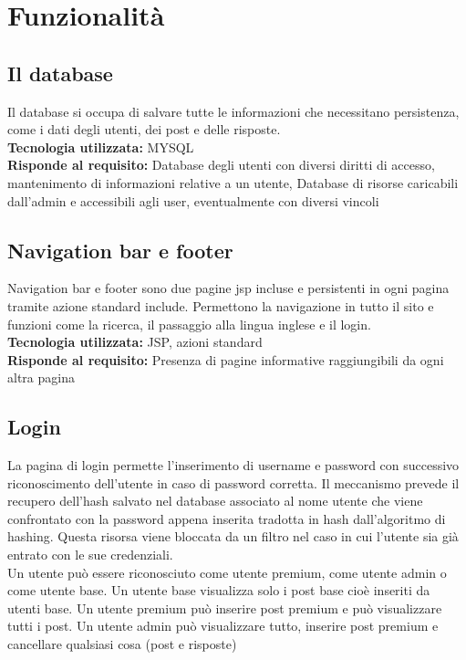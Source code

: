 \documentclass{article} %
\begin{document}
    \section{Funzionalità}

    \subsection{Il database}
    Il database si occupa di salvare tutte le informazioni che necessitano persistenza, come i dati degli utenti,
    dei post e delle risposte. \\

    \textbf{Tecnologia utilizzata:} MYSQL \\
    \textbf{Risponde al requisito:} Database degli utenti con diversi diritti di accesso, mantenimento di informazioni relative a un utente,
    Database di risorse caricabili dall’admin e accessibili agli user, eventualmente con diversi vincoli

    \subsection{Navigation bar e footer}
    Navigation bar e footer sono due pagine jsp incluse e persistenti in ogni pagina tramite azione standard include.
    Permettono la navigazione in tutto il sito e funzioni come la ricerca, il passaggio alla lingua inglese e il login. \\

    \textbf{Tecnologia utilizzata:} JSP, azioni standard \\
    \textbf{Risponde al requisito:} Presenza di pagine informative raggiungibili da ogni altra pagina

    \subsection{Login}
    La pagina di login permette l'inserimento di username e password con successivo riconoscimento
    dell'utente in caso di password corretta. Il meccanismo prevede il recupero dell'hash salvato nel database
    associato al nome utente che viene confrontato con la password appena inserita tradotta in hash dall'algoritmo
    di hashing. Questa risorsa viene bloccata da un filtro nel caso in cui l'utente sia già entrato con le sue credenziali. \\

    Un utente può essere riconosciuto come utente premium, come utente admin o come utente base.
    Un utente base visualizza solo i post base cioè inseriti da utenti base.
    Un utente premium può inserire post premium e può visualizzare tutti i post.
    Un utente admin può visualizzare tutto, inserire post premium e cancellare qualsiasi cosa (post e risposte)
    
\end{document}
